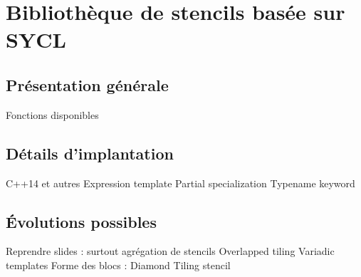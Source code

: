 
\chapter{Bibliothèque de stencils basée sur SYCL}

\section{Présentation générale}

Fonctions disponibles

\section{Détails d'implantation}

C++14 et autres
Expression template \cite{Web4,Art21}
Partial specialization \cite{Web1}
Typename keyword \cite{Web2}

\section{\'Evolutions possibles}

Reprendre slides : surtout agrégation de stencils
Overlapped tiling \cite{Art17}
Variadic templates \cite{Art6}
Forme des blocs : Diamond Tiling stencil \cite{Art16}


